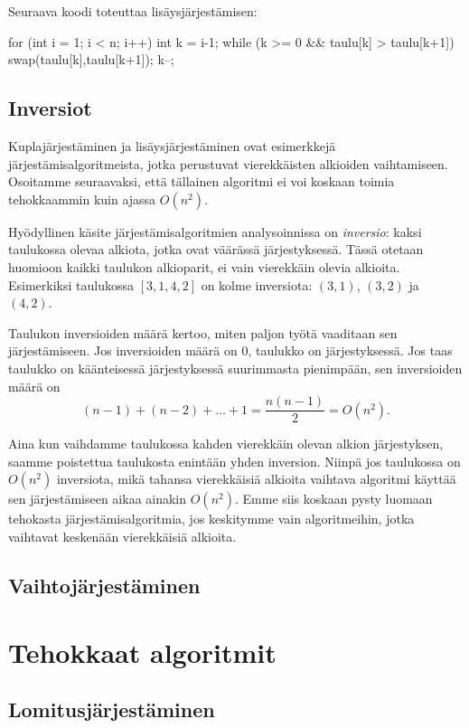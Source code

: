 Seuraava koodi toteuttaa lisäysjärjestämisen:

\begin{code}
for (int i = 1; i < n; i++) {
    int k = i-1;
    while (k >= 0 && taulu[k] > taulu[k+1]) {
        swap(taulu[k],taulu[k+1]);
        k--;
    }
}
\end{code}

\subsection{Inversiot}

Kuplajärjestäminen ja lisäysjärjestäminen ovat esimerkkejä
järjestämis\-algoritmeista, jotka perustuvat vierekkäisten
alkioiden vaihtamiseen.
Osoitamme seuraavaksi, että tällainen algoritmi ei voi koskaan
toimia tehokkaammin kuin ajassa $O(n^2)$.

Hyödyllinen käsite järjestämisalgoritmien analysoinnissa
on \emph{inversio}: kaksi taulukossa olevaa alkiota,
jotka ovat väärässä järjestyksessä.
Tässä otetaan huomioon kaikki taulukon alkioparit,
ei vain vierekkäin olevia alkioita.
Esimerkiksi taulukossa $[3,1,4,2]$ on kolme inversiota:
$(3,1)$, $(3,2)$ ja $(4,2)$.

Taulukon inversioiden määrä kertoo, miten paljon työtä
vaaditaan sen järjestämiseen. Jos inversioiden määrä on 0,
taulukko on järjestyksessä.
Jos taas taulukko on käänteisessä järjestyksessä
suurimmasta pienimpään, sen inversioiden määrä on
\[
(n-1) + (n-2) + \dots + 1 = \frac{n(n-1)}{2} = O(n^2).
\]

Aina kun vaihdamme taulukossa kahden vierekkäin olevan
alkion järjes\-tyksen, saamme poistettua taulukosta enintään
yhden inversion.
Niinpä jos taulukossa on $O(n^2)$ inversiota,
mikä tahansa vierekkäisiä alkioita vaihtava algoritmi
käyttää sen järjestämiseen aikaa ainakin $O(n^2)$.
Emme siis koskaan pysty luomaan tehokasta järjestämisalgoritmia,
jos keskitymme vain algoritmeihin, jotka vaihtavat
keskenään vierekkäisiä alkioita.

\subsection{Vaihtojärjestäminen}

\section{Tehokkaat algoritmit}

\subsection{Lomitusjärjestäminen}

